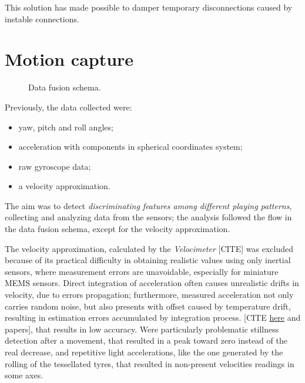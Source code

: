 This solution has made possible to damper temporary disconnections caused by instable connections.

\section{Motion capture}

\begin{center}
	\begin{figure}[ht!]
		\caption{Data fusion schema.}
	\end{figure}
\end{center}
Previously, the data collected were:
\begin{itemize}
	\item yaw, pitch and roll angles;
	\item acceleration with components in spherical coordinates system;
	\item raw gyroscope data;
	\item a velocity approximation.
\end{itemize}
\bigbreak

The aim was to detect \textit{discriminating features among different playing patterns}, collecting and analyzing data from the sensors; the analysis followed the flow in the data fusion schema, except for the velocity approximation.
\bigbreak

The velocity approximation, calculated by the \textit{Velocimeter} [CITE] was excluded because of its practical difficulty in obtaining realistic values using only inertial sensors, where measurement errors are unavoidable, especially for miniature MEMS sensors. Direct integration of acceleration often causes unrealistic drifts in velocity, due to errors propagation; furthermore, measured acceleration not only carries random noise, but also presents with offset caused by temperature drift, resulting in estimation errors accumulated by integration process. [CITE \href{http://www.chrobotics.com/library/accel-position-velocity}{here} and papers], that results in low accuracy. Were particularly problematic stillness detection after a movement, that resulted in a peak toward zero instead of the real decrease, and repetitive light accelerations, like the one generated by the rolling of the tessellated tyres, that resulted in non-present velocities readings in some axes.
\bigbreak

